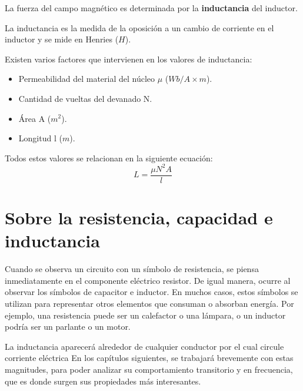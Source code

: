 La fuerza del campo magnético es determinada por la \textbf{inductancia} del inductor.

La inductancia es la medida de la oposición a un cambio de corriente en el inductor y se mide en Henries ($H$).

Existen varios factores que intervienen en los valores de inductancia:
\begin{itemize}
	\item Permeabilidad del material del núcleo $\mu$ ($Wb/A\times m$).
	\item Cantidad de vueltas del devanado N.
	\item Área A ($m^{2}$).
	\item Longitud l ($m$).
\end{itemize}

Todos estos valores se relacionan en la siguiente ecuación:
\begin{equation}
	\label{eq:inductancia}
	L= \frac{\mu N^{2}A}{l}
\end{equation}
\section{Sobre la resistencia, capacidad e inductancia}
Cuando se observa un circuito con un símbolo de resistencia, se piensa inmediatamente en el componente eléctrico resistor. De igual manera, ocurre al observar los símbolos de capacitor e inductor. En muchos casos, estos símbolos se utilizan para representar otros elementos que consuman o absorban energía. Por ejemplo, una resistencia puede ser un calefactor o una lámpara, o un inductor podría ser un parlante o un motor.

La inductancia aparecerá alrededor de cualquier conductor por el cual circule corriente eléctrica
En los capítulos siguientes, se trabajará brevemente con estas magnitudes, para poder analizar su comportamiento transitorio y en frecuencia, que es donde surgen sus propiedades más interesantes.